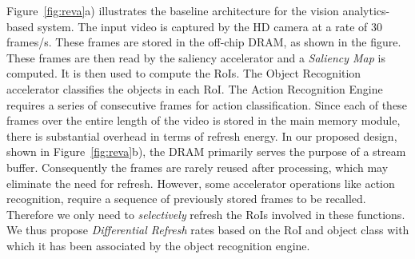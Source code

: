 
\begin{figure*}[ht!]
\begin{minipage}[b]{0.36\linewidth}
\raggedleft
{}
\caption{\label{fig:reva}a) Baseline architecture}
\end{minipage}
\addtocounter{figure}{-1}
\begin{minipage}[b]{0.37\linewidth}
\centering
{}
\caption{\label{fig:reva}b) Architecture of Proposed System}
\end{minipage}
\addtocounter{figure}{-1}
\begin{minipage}[b]{0.25\linewidth}
\raggedright
{}
\caption{\label{fig:reva}c) Design of REVA block}
\end{minipage}
\end{figure*}


Figure~\ref{fig:reva}a) illustrates the baseline architecture for the vision analytics-based system. The input video is captured by the HD camera at a rate of 30 frames/s. 
These frames are stored in the off-chip DRAM, as shown in the figure. These frames are then read by the saliency accelerator and a \emph{Saliency Map} is computed. It is then used to compute the RoIs. The Object Recognition accelerator classifies the objects in each RoI. The Action Recognition Engine requires a series of consecutive frames for action classification. Since each of these frames over the entire length of the video is stored in the main memory module, there is substantial overhead in terms of refresh energy. In our proposed design, shown in Figure~\ref{fig:reva}b), the DRAM primarily serves the purpose of a stream buffer. Consequently the frames are rarely reused after processing, which may eliminate the need for refresh. 
However, some accelerator operations like action recognition, require a sequence of previously stored frames to be recalled. Therefore we only need to \emph{selectively} refresh the RoIs involved in these functions. We thus propose \emph{Differential Refresh} rates based on the RoI and object class with which it has been associated by the object recognition engine.

